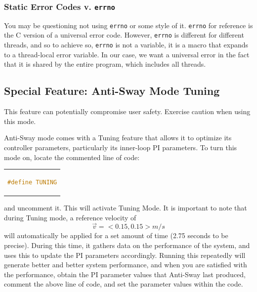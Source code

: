 \documentclass[letterpaper]{article}
\begin{document}
\subsubsection{Static Error Codes v. \texttt{errno}}
You may be questioning not using \texttt{errno} or some style of it. \texttt{errno} for reference is the C version of a universal error code. However, \texttt{errno} is different for different threads, and so to achieve so, \texttt{errno} is not a variable, it is a macro that expands to a thread-local error variable. In our case, we want a universal error in the fact that it is shared by the entire program, which includes all threads.

\newpage

\subsection{Special Feature: Anti-Sway Mode Tuning}
\begin{tcolorbox}[colframe=red!75!black,colback=yellow!5, title=WARNING]
    This feature can potentially compromise user safety. Exercise caution when using this mode.
\end{tcolorbox}
Anti-Sway mode comes with a Tuning feature that allows it to optimize its controller parameters, particularly its inner-loop PI parameters. To turn this mode on, locate the commented line of code:
\begin{center}
    \begin{tabular}{c}
        \begin{lstlisting}[language=C]
            #define TUNING
        \end{lstlisting}
    \end{tabular}
\end{center}

and uncomment it. This will activate Tuning Mode. It is important to note that during Tuning mode, a reference velocity of $$\vec{v}=<0.15, 0.15> m/s$$ will automatically be applied for a set amount of time (2.75 seconds to be precise). During this time, it gathers data on the performance of the system, and uses this to update the PI parameters accordingly. Running this repeatedly will generate better and better system performance, and when you are satisfied with the performance, obtain the PI parameter values that Anti-Sway last produced, comment the above line of code, and set the parameter values within the code.
\end{document}
